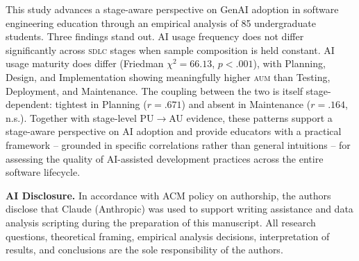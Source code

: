 \documentclass[sigconf,anonymous]{acmart}
\newcommand{\AUM}{\textsc{aum}\xspace}
\newcommand{\SDLC}{\textsc{sdlc}\xspace}
\newcommand{\GenAI}{GenAI\xspace}
\begin{document}
This study advances a stage-aware perspective on \GenAI adoption in
software engineering education through an empirical analysis of 85
undergraduate students. Three findings stand out. AI usage frequency
does not differ significantly across \SDLC stages when sample
composition is held constant. AI usage maturity does differ
(Friedman $\chi^2 = 66.13$, $p < .001$), with Planning, Design, and
Implementation showing meaningfully higher \AUM than Testing,
Deployment, and Maintenance. The coupling between the two is itself
stage-dependent: tightest in Planning ($r = .671$) and absent in
Maintenance ($r = .164$, n.s.). Together with stage-level 
PU$\rightarrow$AU evidence, these patterns support a stage-aware
perspective on AI adoption and provide educators with a practical
framework -- grounded in specific correlations rather than general
intuitions -- for assessing the quality of AI-assisted development
practices across the entire software lifecycle.

\begin{acks}

\medskip\noindent\textbf{AI Disclosure.} In accordance with ACM policy on
authorship, the authors disclose that Claude (Anthropic) was used to
support writing assistance and data analysis scripting during the
preparation of this manuscript. All research questions, theoretical
framing, empirical analysis decisions, interpretation of results, and
conclusions are the sole responsibility of the authors.
\end{acks}

\newpage


\end{document}
